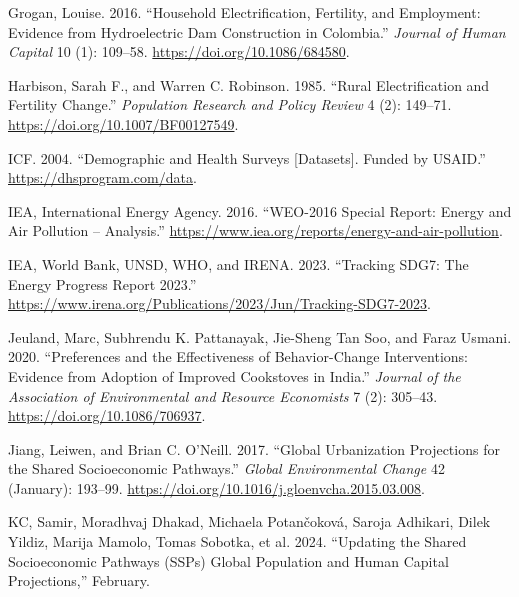 \documentclass[
]{article}
\newlength{\cslhangindent}
\newlength{\cslentryspacingunit} %
\newenvironment{CSLReferences}[2] %
 {%
  \setlength{\parindent}{0pt}
  \ifodd #1
  \let\oldpar\par
  \def\par{\hangindent=\cslhangindent\oldpar}
  \fi
  \setlength{\parskip}{#2\cslentryspacingunit}
 }%
 {}
\begin{document}
\begin{CSLReferences}{1}{0}
\leavevmode{}%
Grogan, Louise. 2016. {``Household {Electrification}, {Fertility}, and {Employment}: {Evidence} from {Hydroelectric} {Dam} {Construction} in {Colombia}.''} \emph{Journal of Human Capital} 10 (1): 109--58. \url{https://doi.org/10.1086/684580}.

\leavevmode{}%
Harbison, Sarah F., and Warren C. Robinson. 1985. {``Rural Electrification and Fertility Change.''} \emph{Population Research and Policy Review} 4 (2): 149--71. \url{https://doi.org/10.1007/BF00127549}.

\leavevmode{}%
ICF. 2004. {``Demographic and {Health} {Surveys} {[}{Datasets}{]}. {Funded} by {USAID}.''} \url{https://dhsprogram.com/data}.

\leavevmode{}%
IEA, International Energy Agency. 2016. {``{WEO}-2016 {Special} {Report}: {Energy} and {Air} {Pollution} -- {Analysis}.''} \url{https://www.iea.org/reports/energy-and-air-pollution}.

\leavevmode{}%
IEA, World Bank, UNSD, WHO, and IRENA. 2023. {``Tracking {SDG7}: {The} Energy Progress Report 2023.''} \url{https://www.irena.org/Publications/2023/Jun/Tracking-SDG7-2023}.

\leavevmode{}%
Jeuland, Marc, Subhrendu K. Pattanayak, Jie-Sheng Tan Soo, and Faraz Usmani. 2020. {``Preferences and the {Effectiveness} of {Behavior}-{Change} {Interventions}: {Evidence} from {Adoption} of {Improved} {Cookstoves} in {India}.''} \emph{Journal of the Association of Environmental and Resource Economists} 7 (2): 305--43. \url{https://doi.org/10.1086/706937}.

\leavevmode{}%
Jiang, Leiwen, and Brian C. O'Neill. 2017. {``Global Urbanization Projections for the {Shared} {Socioeconomic} {Pathways}.''} \emph{Global Environmental Change} 42 (January): 193--99. \url{https://doi.org/10.1016/j.gloenvcha.2015.03.008}.

\leavevmode{}%
KC, Samir, Moradhvaj Dhakad, Michaela Potančoková, Saroja Adhikari, Dilek Yildiz, Marija Mamolo, Tomas Sobotka, et al. 2024. {``Updating the {Shared} {Socioeconomic} {Pathways} ({SSPs}) {Global} {Population} and {Human} {Capital} {Projections},''} February.


\end{CSLReferences}
\end{document}
